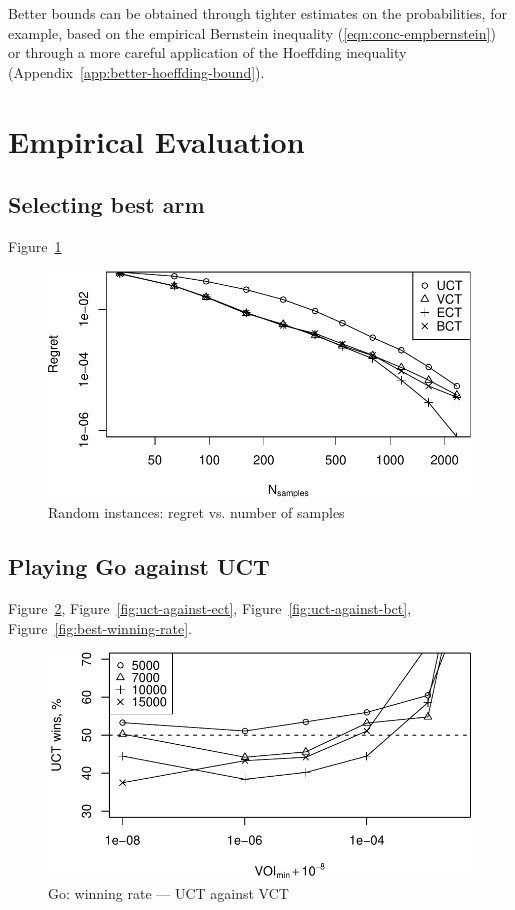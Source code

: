 \documentclass{article}
\begin{document}
Better bounds can be obtained through tighter estimates on
the probabilities, for example, based on the empirical Bernstein
inequality (\ref{eqn:conc-empbernstein}) or through a more careful
application of the Hoeffding inequality (Appendix~\ref{app:better-hoeffding-bound}).

\section{Empirical Evaluation}

\subsection{Selecting best arm}

Figure~\ref{fig:random-instances}

\begin{figure}[h]
\centering
\includegraphics[scale=0.8]{flat.pdf}
\caption{Random instances: regret vs. number of samples}
\label{fig:random-instances}
\end{figure}


\subsection{Playing Go against UCT}

Figure~\ref{fig:uct-against-vct}, Figure~\ref{fig:uct-against-ect}, Figure~\ref{fig:uct-against-bct},
Figure~\ref{fig:best-winning-rate}.

\begin{figure}[h]
\centering
\includegraphics[scale=0.8]{vct-wins.pdf}
\caption{Go: winning rate --- UCT against VCT}
\label{fig:uct-against-vct}
\end{figure}
\end{document}
